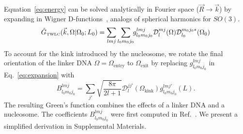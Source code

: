 \documentclass[%
 reprint,
superscriptaddress,
showpacs,preprintnumbers,
 amsmath,amssymb,
 aps,
 prl,
]{revtex4-1}
\newcommand{\ghat}[2][\Omega_0; L_0]{\hat{G}_\text{\tiny TWLC}(#2|#1)}
\newcommand{\wigD}{\mathcal{D}}
\begin{document}
Equation~\ref{eq:energy} can be solved analytically in Fourier space
    ($\vec{R} \rightarrow \vec{k}$) by expanding in Wigner
    D-functions~\cite{spakowitz2006}, analogs of spherical harmonics for
    $SO(3)$.
\begin{equation}\label{eq:expansion}
    \ghat{\vec{k}, \Omega} = \sum_{l m j}\sum_{l_0 m_0 j_0} \!\! g_{l_0 m_0 j_0}^{lmj}
        \wigD_{l}^{mj}(\Omega)\wigD_{l_0}^{m_0 j_0 *}(\Omega_0)
\end{equation}
To account for the kink introduced by the nucleosome, we rotate
    the final orientation of the linker DNA ${\Omega = \Omega_\text{entry}}$ to
    $\Omega_\text{exit}$ by replacing
    $g_{l_0 m_0 j_0}^{lmj}$ in Eq.~\ref{eq:expansion} with
    \begin{equation}\label{eq:coeffs}
        B_{l_{0}m_{0}j_{0}}^{lmj} = %
        \sum_{j'}
        \sqrt{\frac{8\pi}{2l+1}}
        \mathcal{D}_{l}^{jj'}
        \left(\Omega_\text{kink}\right)g_{l_{0}m_{0}j_{0}}^{lmj'}\left(L\right).
    \end{equation}
The resulting Green's function combines the effects of a linker DNA and a nucleosome.
The coefficients $B_{l_0 m_0 j_0}^{lmj}$ were first computed in Ref.~\cite{zhou2003}.
We present a simplified derivation in Supplemental Materials.
\end{document}
